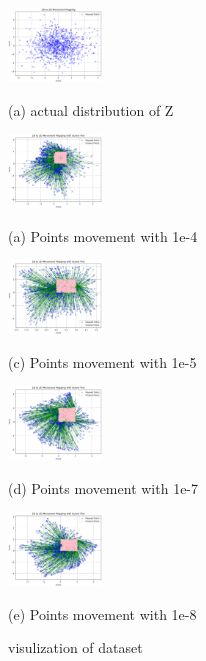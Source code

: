 \documentclass{article}
\begin{document}
\begin{figure}[htb]
  \begin{minipage}[b]{1.0\linewidth}
    \centering
    \centerline{\includegraphics[width=2.5cm]{images/q4_act}}
   \centerline{(a) actual distribution of Z }\medskip
  \end{minipage}
  \begin{minipage}[b]{.48\linewidth}
    \centering
    \centerline{\includegraphics[width=2.5cm]{images/q4_pred_1e-4}}
    \centerline{(a) Points movement with 1e-4}\medskip
  \end{minipage}
  \hfill
  \begin{minipage}[b]{0.48\linewidth}
    \centering
    \centerline{\includegraphics[width=2.5cm]{images/q4_pred_1e-5}}
    \centerline{(c) Points movement with 1e-5}\medskip
  \end{minipage}
  \begin{minipage}[b]{.48\linewidth}
    \centering
    \centerline{\includegraphics[width=2.5cm]{images/q4_pred_1e-7}}
    \centerline{(d) Points movement with 1e-7}\medskip
  \end{minipage}
  \hfill
  \begin{minipage}[b]{0.48\linewidth}
    \centering
    \centerline{\includegraphics[width=2.5cm]{images/q4_pred_1e-8}}
    \centerline{(e) Points movement with 1e-8}\medskip
  \end{minipage}
  \caption{visulization of dataset}
  \label{fig:q4}
  \end{figure}
\end{document}
